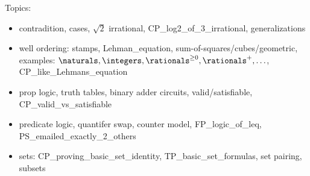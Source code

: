 \documentclass[quiz]{mcs}
\begin{document}


\examspace

\begin{staffnotes}
Topics:
\begin{itemize}
item buggy proof (possible miniquestion: what is the mathematical error re ``suprise''?)

\item contradition, cases, $\sqrt{2}$ irrational, CP\_log2\_of\_3_irrational, generalizations

\item well ordering: stamps, Lehman_equation,
  sum-of-squares/cubes/geometric, examples: $\naturals, \integers,
  \rationals^{\geq 0}, \rationals^{+}, \ldots$, CP\_like\_Lehmans\_equation

\item prop logic, truth tables, binary adder circuits, valid/satisfiable, CP\_valid\_vs\_satisfiable

\item predicate logic, quantifer swap, counter model, FP\_logic\_of\_leq, PS\_emailed\_exactly\_2\_others

\item sets: CP\_proving\_basic\_set\_identity, TP\_basic\_set\_formulas, set pairing, subsets
\end{itemize}
\end{staffnotes}




\end{document}
